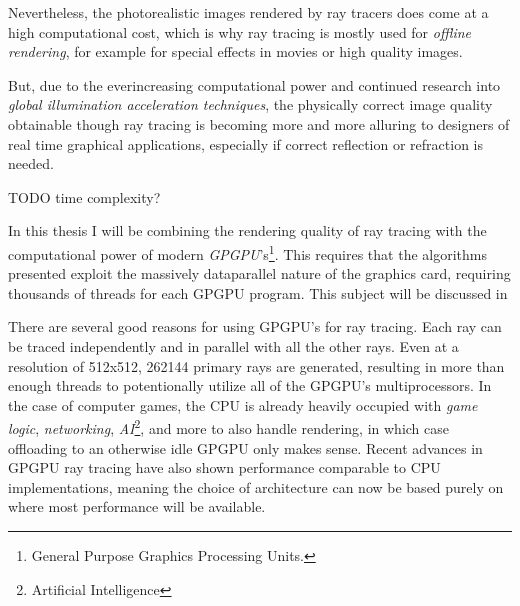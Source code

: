 Nevertheless, the photorealistic images rendered by ray tracers does
come at a high computational cost, which is why ray tracing is mostly
used for \textit{offline rendering}, for example for special effects in
movies or high quality images.



But, due to the everincreasing computational power and continued
research into \textit{global illumination acceleration techniques},
the physically correct image quality obtainable though ray tracing is
becoming more and more alluring to designers of real time graphical
applications, especially if correct reflection or refraction is
needed.


TODO time complexity?


In this thesis I will be combining the rendering quality of ray
tracing with the computational power of modern
\textit{GPGPU}'s\footnote{General Purpose Graphics Processing
  Units.}. This requires that the algorithms presented exploit the
massively dataparallel nature of the graphics card, requiring
thousands of threads for each GPGPU program. This subject will be
discussed in 

There are several good reasons for using GPGPU's for ray tracing. Each
ray can be traced independently and in parallel with all the other
rays. Even at a resolution of 512x512, 262144 primary rays are
generated, resulting in more than enough threads to potentionally
utilize all of the GPGPU's multiprocessors. In the case of computer
games, the CPU is already heavily occupied with \textit{game logic},
\textit{networking}, \textit{AI}\footnote{Artificial Intelligence},
and more to also handle rendering, in which case offloading to an
otherwise idle GPGPU only makes sense. Recent advances in GPGPU ray
tracing have also shown performance comparable to CPU
implementations, meaning
the choice of architecture can now be based purely on where most
performance will be available.

